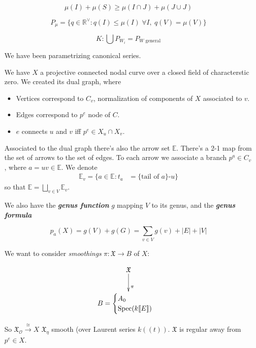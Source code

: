 $$
\mu(I)+\mu(S)\geq \mu(I\cap J)+\mu(J\cup J)
$$

$$
P_\mu=\{q\in\mathbb{R}^{\vee }:q(I)\leq
\mu(I)\;\forall I,\; q(V)=\mu(V)\}
$$

\medskip{}
$$
K:\bigcup P_{W_i}=P_{W\text{ general} }
$$

\bigskip
\medskip{}

\medskip{}

We have been parametrizing canonical series.

We have $X$ a projective connected nodal
curve over a closed field of characterstic
zero. We created its dual graph, where
\begin{itemize}
\item Vertices correspond to $C_{v}$,
normalization of components of $X$ associated
to $v$.
\item Edges correspond to $p^e$ node of $C$.
\item $e$ connects $u$ and $v$ iff  $p^e\in
X_u\cap X_v$.
\end{itemize}

Associated to the dual graph there's also the
arrow set $\mathbb{E}$. There's a 2-1 map
from the set of arrows to the set of edges.
To each arrow we associate a branch $p^a \in
C_v$, where $a=uv\in\mathbb{E}$. We denote
$$
\begin{aligned}
\mathbb{E}_v=\{a\in \mathbb{E}:t_a&=\{\text{
tail of $a$}\}\text{-}u  \}
\end{aligned}
$$
so that $\mathbb{E}=\bigsqcup_{v \in
V}\mathbb{E}_v$.

We also have the \textit{\textbf{genus
function}} $g$ mapping $V$ to its genus, and
the \textit{\textbf{genus formula}}

$$
p_a(X)=g(V)+g(G)=\sum_{v\in V}g(v)+|E| +|V|
$$

\medskip{}

We want to consider \textit{smoothings}
$\pi:\mathfrak{X} \longrightarrow B$ of $X$:

$$
\xymatrix{\mathfrak{X}\ar[d]^{\pi}\\
B={\begin{cases}A_0\\
\operatorname{Spec}(k[\![E]\!])\end{cases}}}
$$

So
$\mathfrak{X}_\mathcal{O}\xrightarrow{\cong
}X$ $\mathfrak{X}_\eta$ smooth (over Laurent
series $k(\!(t)\!)$. $\mathfrak{X}$ is
regular away from $p^e\in X$.

